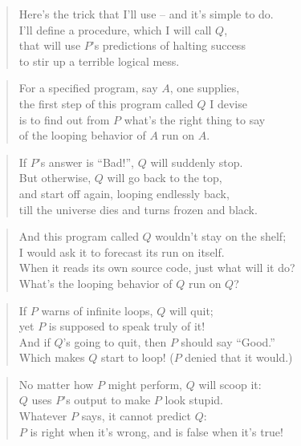 \documentclass{article}
\begin{document}
\begin{verse}
Here's the trick that I’ll use -- and it's simple to do.\\
I’ll define a procedure, which I will call \(Q\),\\
that will use \(P\)'s predictions of halting success\\
to stir up a terrible logical mess.
\end{verse}
\begin{verse}
For a specified program, say \(A\), one supplies,\\
the first step of this program called \(Q\) I devise\\
is to find out from \(P\) what's the right thing to say\\
of the looping behavior of \(A\) run on \(A\).
\end{verse}
\begin{verse}
If \(P\)'s answer is ``Bad!'', \(Q\) will suddenly stop.\\
But otherwise, \(Q\) will go back to the top,\\
and start off again, looping endlessly back,\\
till the universe dies and turns frozen and black.
\end{verse}
\begin{verse}
And this program called \(Q\) wouldn't stay on the shelf;\\
I would ask it to forecast its run on itself.\\
When it reads its own source code, just what will it do?\\
What's the looping behavior of \(Q\) run on \(Q\)?
\end{verse}
\begin{verse}
If \(P\) warns of infinite loops, \(Q\) will quit;\\
yet \(P\) is supposed to speak truly of it!\\
And if \(Q\)'s going to quit, then \(P\) should say ``Good.''\\
Which makes \(Q\) start to loop! (\(P\) denied that it would.)
\end{verse}
\begin{verse}
No matter how \(P\) might perform, \(Q\) will scoop it:\\
\(Q\) uses \(P\)'s output to make \(P\) look stupid.\\
	Whatever \(P\) says, it cannot predict \(Q\):\\
\(P\) is right when it's wrong, and is false when it's true!
\end{verse}
\end{document}
